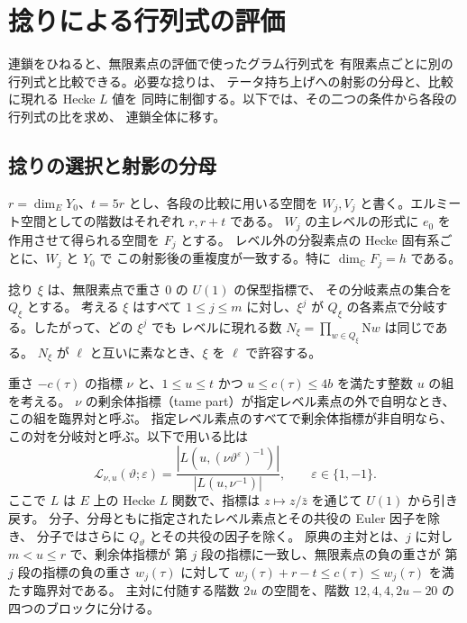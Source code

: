 \section{捻りによる行列式の評価}
\label{sec:determinant-estimates}

連鎖をひねると、無限素点の評価で使ったグラム行列式を
有限素点ごとに別の行列式と比較できる。必要な捻りは、
テータ持ち上げへの射影の分母と、比較に現れる Hecke \(L\) 値を
同時に制御する。以下では、その二つの条件から各段の行列式の比を求め、
連鎖全体に移す。

\subsection{捻りの選択と射影の分母}\label{subsec:denominator-twists}

\(r=\dim_E Y_0\)、\(t=5r\) とし、各段の比較に用いる空間を
\(W_j,V_j\) と書く。エルミート空間としての階数はそれぞれ \(r,r+t\) である。
\(W_j\) の主レベルの形式に \(e_0\) を作用させて得られる空間を \(F_j\) とする。
レベル外の分裂素点の Hecke 固有系ごとに、\(W_j\) と \(Y_0\) で
この射影後の重複度が一致する。特に \(\dim_{\mathbb C} F_j=h\) である。

捻り \(\xi\) は、無限素点で重さ \(0\) の \(U(1)\) の保型指標で、
その分岐素点の集合を \(Q_\xi\) とする。
考える \(\xi\) はすべて \(1\le j\le m\) に対し、\(\xi^j\) が
\(Q_\xi\) の各素点で分岐する。したがって、どの \(\xi^j\) でも
レベルに現れる数 \(N_\xi=\prod_{w\in Q_\xi} \mathrm Nw\) は同じである。
\(N_\xi\) が \(\ell\) と互いに素なとき、\(\xi\) を \(\ell\) で許容する。

重さ \(-c(\tau)\) の指標 \(\nu\) と、\(1\le u\le t\) かつ
\(u\le c(\tau)\le4b\) を満たす整数 \(u\) の組を考える。
\(\nu\) の剰余体指標（tame part）が指定レベル素点の外で自明なとき、この組を臨界対と呼ぶ。
指定レベル素点のすべてで剰余体指標が非自明なら、
この対を分岐対と呼ぶ。以下で用いる比は
\[
 \mathcal L_{\nu,u}(\vartheta;\varepsilon)
 =
 \frac{|L(u,(\nu\vartheta^\varepsilon)^{-1})|}
      {|L(u,\nu^{-1})|},
 \qquad \varepsilon\in\{1,-1\}.
\]
ここで \(L\) は \(E\) 上の Hecke \(L\) 関数で、指標は
\(z\mapsto z/\bar z\) を通じて \(U(1)\) から引き戻す。
分子、分母ともに指定されたレベル素点とその共役の Euler 因子を除き、
分子ではさらに \(Q_\vartheta\) とその共役の因子を除く。
原典の主対とは、\(j\) に対し \(m<u\le r\) で、剰余体指標が
第 \(j\) 段の指標に一致し、無限素点の負の重さが
第 \(j\) 段の指標の負の重さ \(w_j(\tau)\) に対して
\(w_j(\tau)+r-t\le c(\tau)\le w_j(\tau)\) を満たす臨界対である。
主対に付随する階数 \(2u\) の空間を、階数
\(12,4,4,2u-20\) の四つのブロックに分ける。

